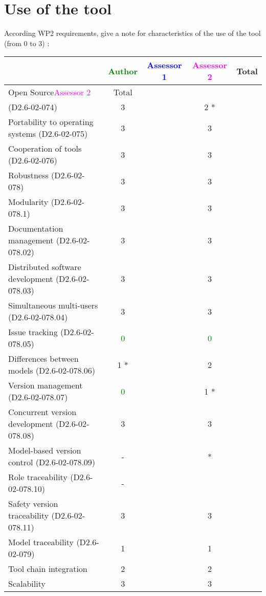 \section{Use of the tool}


According WP2 requirements, give a note for characteristics of the use of the tool (from 0 to 3) :

\begin{tabular}{|l | c | c | c | c|}
\hline
& \textcolor{green}{Author} & \textcolor{blue}{Assessor 1} & \textcolor{magenta}{Assessor 2} & Total \\
\hline 
Open Source\textcolor{magenta}{Assessor 2} & Total \\ (D2.6-02-074) & 3    & & 2   *&  \\
\hline 
Portability to operating systems (D2.6-02-075) & 3    & & 3    &  \\
\hline
Cooperation of tools (D2.6-02-076) & 3    & & 3    &  \\
\hline
Robustness (D2.6-02-078) & 3    & & 3    & \\
\hline
Modularity (D2.6-02-078.1) & 3    & & 3    & \\
\hline
Documentation management (D2.6-02-078.02) & 3    & & 3    & \\
\hline
Distributed software development (D2.6-02-078.03)  & 3    & & 3    & \\
\hline
Simultaneous multi-users (D2.6-02-078.04)   & 3    & & 3    & \\
\hline
Issue tracking (D2.6-02-078.05) & \textcolor{green}{0} & & \textcolor{green}{0} & \\
\hline
Differences between models (D2.6-02-078.06) & 1   * & & 2    & \\
\hline
Version management (D2.6-02-078.07) & \textcolor{green}{0} & & 1   * & \\
\hline
Concurrent version development (D2.6-02-078.08) & 3    & & 3    & \\
\hline
Model-based version control (D2.6-02-078.09) & - & & * & \\
\hline
Role traceability (D2.6-02-078.10) & - & & & \\
\hline
Safety version traceability (D2.6-02-078.11) & 3    & & 3    & \\
\hline
Model traceability (D2.6-02-079) & 1    & & 1    & \\
\hline
Tool chain integration & 2    & & 2    & \\
\hline
Scalability & 3    & & 3    & \\
\hline
\end{tabular}

